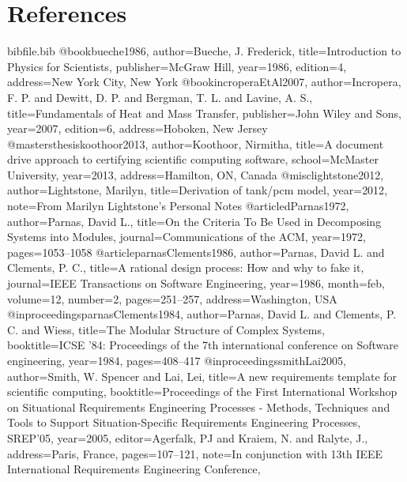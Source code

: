 \documentclass[12pt]{article}
\begin{document}
\section{References}
\label{Sec:References}
\begin{filecontents*}{bibfile.bib}
@book{bueche1986,
author={Bueche, J. Frederick},
title={Introduction to Physics for Scientists},
publisher={McGraw Hill},
year={1986},
edition={4},
address={New York City, New York}}
@book{incroperaEtAl2007,
author={Incropera, F. P. and Dewitt, D. P. and Bergman, T. L. and Lavine, A. S.},
title={Fundamentals of Heat and Mass Transfer},
publisher={John Wiley and Sons},
year={2007},
edition={6},
address={Hoboken, New Jersey}}
@mastersthesis{koothoor2013,
author={Koothoor, Nirmitha},
title={A document drive approach to certifying scientific computing software},
school={McMaster University},
year={2013},
address={Hamilton, ON, Canada}}
@misc{lightstone2012,
author={Lightstone, Marilyn},
title={Derivation of tank/pcm model},
year={2012},
note={From Marilyn Lightstone's Personal Notes}}
@article{dParnas1972,
author={Parnas, David L.},
title={On the Criteria To Be Used in Decomposing Systems into Modules},
journal={Communications of the ACM},
year={1972},
pages={1053--1058}}
@article{parnasClements1986,
author={Parnas, David L. and Clements, P. C.},
title={A rational design process: How and why to fake it},
journal={IEEE Transactions on Software Engineering},
year={1986},
month=feb,
volume={12},
number={2},
pages={251--257},
address={Washington, USA}}
@inproceedings{parnasClements1984,
author={Parnas, David L. and Clements, P. C. and Wiess},
title={The Modular Structure of Complex Systems},
booktitle={ICSE '84: Proceedings of the 7th international conference on Software engineering},
year={1984},
pages={408--417}}
@inproceedings{smithLai2005,
author={Smith, W. Spencer and Lai, Lei},
title={A new requirements template for scientific computing},
booktitle={Proceedings of the First International Workshop on Situational Requirements Engineering Processes - Methods, Techniques and Tools to Support Situation-Specific Requirements Engineering Processes, SREP'05},
year={2005},
editor={Agerfalk, PJ and Kraiem, N. and Ralyte, J.},
address={Paris, France},
pages={107--121},
note={In conjunction with 13th IEEE International Requirements Engineering Conference,}}
\end{filecontents*}
\nocite{*}
\printbibliography[heading=none]
\end{document}
